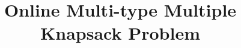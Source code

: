 \documentclass{article}
\title{Online Multi-type Multiple Knapsack Problem}
\begin{document}
\maketitle{}







% 











\end{document}
